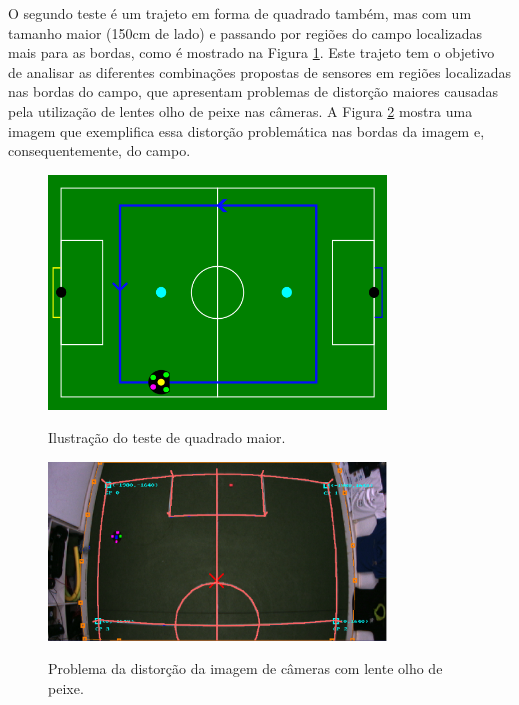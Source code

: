 \documentclass[acronym, symbols, table, deposito]{fei}
\begin{document}
		O segundo teste é um trajeto em forma de quadrado também, mas com um tamanho maior (150cm de lado) e passando por regiões do campo localizadas mais para as bordas, como é mostrado na Figura \ref{fig:representacao_teste_quadrado_maior}. Este trajeto tem o objetivo de analisar as diferentes combinações propostas de sensores em regiões localizadas nas bordas do campo, que apresentam problemas de distorção maiores causadas pela utilização de lentes olho de peixe nas câmeras. A Figura \ref{fig:problema_distorcao} mostra uma imagem que exemplifica essa distorção problemática nas bordas da imagem e, consequentemente, do campo.
			
		\begin{figure}[!htb]
			\centering
			\caption{Ilustração do teste de quadrado maior.}
			\includegraphics[width=0.80\textwidth]{representacao_teste_quadrado_maior.png}
			\label{fig:representacao_teste_quadrado_maior}
		\end{figure}
	
		\begin{figure}[!htb]
			\centering
			\caption{Problema da distorção da imagem de câmeras com lente olho de peixe.}
			\includegraphics[width=0.80\textwidth]{problema_distorcao_2.png}
			\label{fig:problema_distorcao}
		\end{figure}
	
\end{document}
